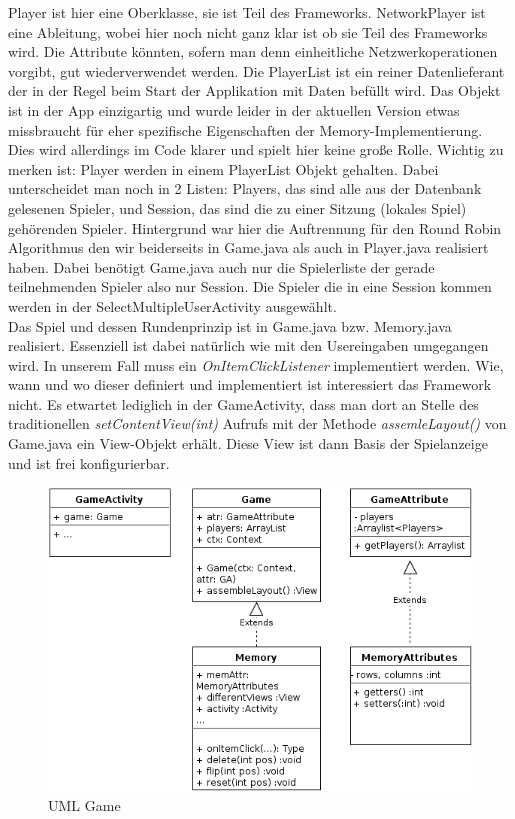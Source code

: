 \documentclass[11pt,a4paper]{article}
\begin{document}
Player ist hier eine Oberklasse, sie ist Teil des Frameworks. NetworkPlayer ist eine Ableitung, wobei hier noch nicht ganz klar ist ob sie Teil des Frameworks wird. Die Attribute könnten, sofern man denn einheitliche Netzwerkoperationen vorgibt, gut wiederverwendet werden. Die PlayerList ist ein reiner Datenlieferant der in der Regel beim Start der Applikation mit Daten befüllt wird. Das Objekt ist in der App einzigartig und wurde leider in der aktuellen Version etwas missbraucht für eher spezifische Eigenschaften der Memory-Implementierung. Dies wird allerdings im Code klarer und spielt hier keine große Rolle. Wichtig zu merken ist: Player werden in einem PlayerList Objekt gehalten. Dabei unterscheidet man noch in 2 Listen: Players, das sind alle aus der Datenbank gelesenen Spieler, und Session, das sind die zu einer Sitzung (lokales Spiel) gehörenden Spieler. Hintergrund war hier die Auftrennung für den Round Robin Algorithmus den wir beiderseits in Game.java als auch in Player.java realisiert haben. Dabei benötigt Game.java auch nur die Spielerliste der gerade teilnehmenden Spieler also nur Session. Die Spieler die in eine Session kommen werden in der SelectMultipleUserActivity ausgewählt.\\
Das Spiel und dessen Rundenprinzip ist in Game.java bzw. Memory.java realisiert. Essenziell ist dabei natürlich wie mit den Usereingaben umgegangen wird. In unserem Fall muss ein \emph{OnItemClickListener} implementiert werden. Wie, wann und wo dieser definiert und implementiert ist interessiert das Framework nicht. Es etwartet lediglich in der GameActivity, dass man dort an Stelle des traditionellen \emph{setContentView(int)} Aufrufs mit der Methode \emph{assemleLayout()} von Game.java ein View-Objekt erhält. Diese View ist dann Basis der Spielanzeige und ist frei konfigurierbar.
\\
\begin{figure}[!h]
\centering
\includegraphics[scale=0.5]{pics/UML.png}
\caption{UML Game}
\label{fig:UML}
\end{figure}\\
\end{document}
